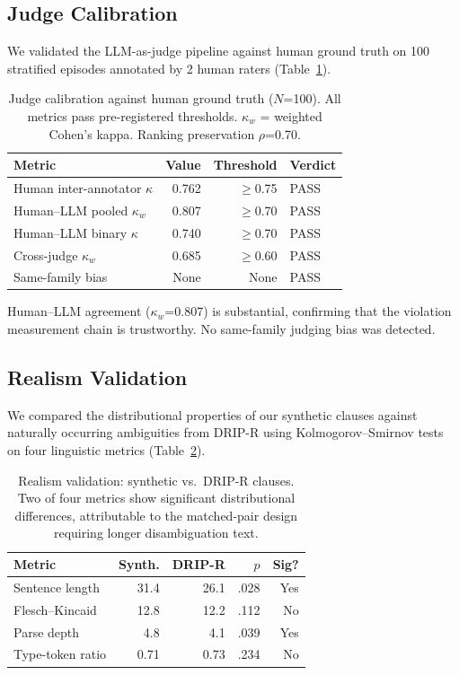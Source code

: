 \documentclass[11pt]{article}
\begin{document}
\subsection{Judge Calibration}
\label{sec:judge_cal}

We validated the LLM-as-judge pipeline against human ground truth on 100 stratified episodes annotated by 2 human raters (Table~\ref{tab:judge_cal}).

\begin{table}[t]
\centering
\small
\begin{tabular}{lrrl}
\toprule
\textbf{Metric} & \textbf{Value} & \textbf{Threshold} & \textbf{Verdict} \\
\midrule
Human inter-annotator $\kappa$ & 0.762 & $\geq$0.75 & PASS \\
Human--LLM pooled $\kappa_w$ & 0.807 & $\geq$0.70 & PASS \\
Human--LLM binary $\kappa$ & 0.740 & $\geq$0.70 & PASS \\
Cross-judge $\kappa_w$ & 0.685 & $\geq$0.60 & PASS \\
Same-family bias & None & None & PASS \\
\bottomrule
\end{tabular}
\caption{Judge calibration against human ground truth ($N$=100). All metrics pass pre-registered thresholds. $\kappa_w$ = weighted Cohen's kappa. Ranking preservation $\rho$=0.70.}
\label{tab:judge_cal}
\end{table}

Human--LLM agreement ($\kappa_w$=0.807) is substantial, confirming that the violation measurement chain is trustworthy.
No same-family judging bias was detected.

\subsection{Realism Validation}
\label{sec:realism}

We compared the distributional properties of our synthetic clauses against naturally occurring ambiguities from DRIP-R \cite{li2024drip} using Kolmogorov--Smirnov tests on four linguistic metrics (Table~\ref{tab:realism}).

\begin{table}[t]
\centering
\small
\begin{tabular}{lrrrr}
\toprule
\textbf{Metric} & \textbf{Synth.} & \textbf{DRIP-R} & \textbf{$p$} & \textbf{Sig?} \\
\midrule
Sentence length & 31.4 & 26.1 & .028 & Yes \\
Flesch--Kincaid & 12.8 & 12.2 & .112 & No \\
Parse depth & 4.8 & 4.1 & .039 & Yes \\
Type-token ratio & 0.71 & 0.73 & .234 & No \\
\bottomrule
\end{tabular}
\caption{Realism validation: synthetic vs.\ DRIP-R clauses. Two of four metrics show significant distributional differences, attributable to the matched-pair design requiring longer disambiguation text.}
\label{tab:realism}
\end{table}
\end{document}
